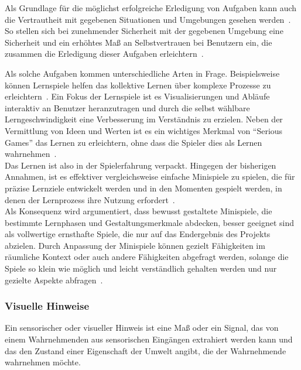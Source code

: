 Als Grundlage für die möglichst erfolgreiche Erledigung von Aufgaben kann auch die Vertrautheit mit gegebenen Situationen und Umgebungen gesehen werden~\cite{scott1966activation}. So stellen sich bei zunehmender Sicherheit mit der gegebenen Umgebung eine Sicherheit und ein erhöhtes Maß an Selbstvertrauen bei Benutzern ein, die zusammen die Erledigung dieser Aufgaben erleichtern~\cite{scott1966activation}. 

Als solche Aufgaben kommen unterschiedliche Arten in Frage. Beispielsweise können Lernspiele helfen das kollektive Lernen über komplexe Prozesse zu erleichtern~\cite{devisch2018mini, lampert2008gespielte, michael2005serious, ritterfeld2009serious}.
Ein Fokus der Lernspiele ist es Visualisierungen und Abläufe interaktiv an Benutzer heranzutragen und durch die selbst wählbare Lerngeschwindigkeit eine Verbesserung im Verständnis zu erzielen.
Neben der Vermittlung von Ideen und Werten ist es ein wichtiges Merkmal von "`Serious Games"' das Lernen zu erleichtern, ohne dass die Spieler dies als Lernen wahrnehmen~\cite{devisch2018mini, michael2005serious, ritterfeld2009serious}.\\
Das Lernen ist also in der Spielerfahrung verpackt.
Hingegen der bisherigen Annahmen, ist es effektiver vergleichsweise einfache Minispiele zu spielen, die für präzise Lernziele entwickelt werden und in den Momenten gespielt werden, in denen der Lernprozess ihre Nutzung erfordert~\cite{devisch2018mini}.\\
Als Konsequenz wird argumentiert, dass bewusst gestaltete Minispiele, die bestimmte Lernphasen und Gestaltungsmerkmale abdecken, besser geeignet sind als vollwertige ernsthafte Spiele, die nur auf das Endergebnis des Projekts abzielen. 
Durch Anpassung der Minispiele können gezielt Fähigkeiten im räumliche Kontext oder auch andere Fähigkeiten abgefragt werden, solange die Spiele so klein wie möglich und leicht verständlich gehalten werden und nur gezielte Aspekte abfragen~\cite{devisch2018mini, michael2005serious, ritterfeld2009serious}.

\subsubsection{Visuelle Hinweise}

Ein sensorischer oder visueller Hinweis ist eine Maß oder ein Signal, das von einem Wahrnehmenden aus sensorischen Eingängen extrahiert werden kann und das den Zustand einer Eigenschaft der Umwelt angibt, die der Wahrnehmende wahrnehmen möchte.

